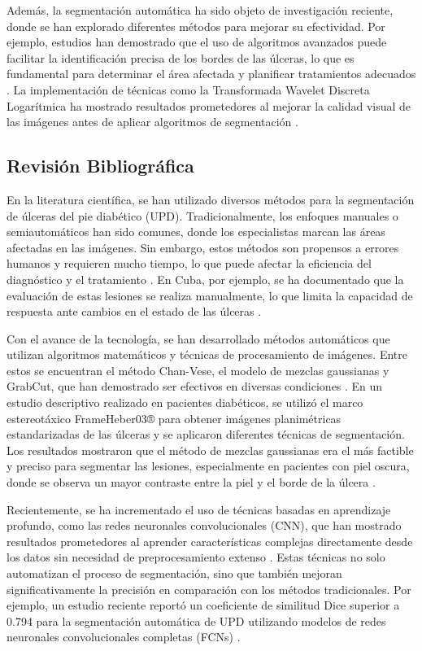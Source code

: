 \documentclass[12pt]{article}
\begin{document}
		Además, la segmentación automática ha sido objeto de investigación reciente, donde se han explorado diferentes métodos para mejorar su efectividad. Por ejemplo, estudios han demostrado que el uso de algoritmos avanzados puede facilitar la identificación precisa de los bordes de las úlceras, lo que es fundamental para determinar el área afectada y planificar tratamientos adecuados \cite{Gomez2019}. La implementación de técnicas como la Transformada Wavelet Discreta Logarítmica ha mostrado resultados prometedores al mejorar la calidad visual de las imágenes antes de aplicar algoritmos de segmentación \cite{Heber2019}.
		
		\subsection{Revisi\'on Bibliogr\'afica}
	En la literatura científica, se han utilizado diversos métodos para la segmentación de úlceras del pie diabético (UPD). Tradicionalmente, los enfoques manuales o semiautomáticos han sido comunes, donde los especialistas marcan las áreas afectadas en las imágenes. Sin embargo, estos métodos son propensos a errores humanos y requieren mucho tiempo, lo que puede afectar la eficiencia del diagnóstico y el tratamiento \cite{Heber2019}. En Cuba, por ejemplo, se ha documentado que la evaluación de estas lesiones se realiza manualmente, lo que limita la capacidad de respuesta ante cambios en el estado de las úlceras \cite{Heber2019}.
	
	Con el avance de la tecnología, se han desarrollado métodos automáticos que utilizan algoritmos matemáticos y técnicas de procesamiento de imágenes. Entre estos se encuentran el método Chan-Vese, el modelo de mezclas gaussianas y GrabCut, que han demostrado ser efectivos en diversas condiciones \cite{Gomez2019}. En un estudio descriptivo realizado en pacientes diabéticos, se utilizó el marco estereotáxico FrameHeber03® para obtener imágenes planimétricas estandarizadas de las úlceras y se aplicaron diferentes técnicas de segmentación. Los resultados mostraron que el método de mezclas gaussianas era el más factible y preciso para segmentar las lesiones, especialmente en pacientes con piel oscura, donde se observa un mayor contraste entre la piel y el borde de la úlcera \cite{Heber2019}.
	
	Recientemente, se ha incrementado el uso de técnicas basadas en aprendizaje profundo, como las redes neuronales convolucionales (CNN), que han mostrado resultados prometedores al aprender características complejas directamente desde los datos sin necesidad de preprocesamiento extenso \cite{Gomez2020}. Estas técnicas no solo automatizan el proceso de segmentación, sino que también mejoran significativamente la precisión en comparación con los métodos tradicionales. Por ejemplo, un estudio reciente reportó un coeficiente de similitud Dice superior a 0.794 para la segmentación automática de UPD utilizando modelos de redes neuronales convolucionales completas (FCNs) \cite{Gomez2020}.
	\\
	
\end{document}
